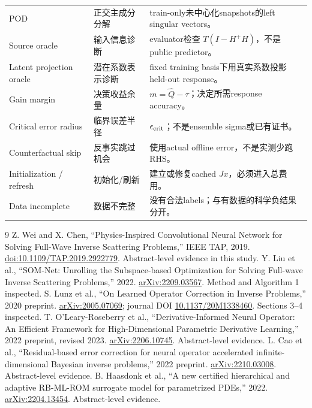 \documentclass[UTF8,11pt,a4paper,fontset=fandol]{ctexart}
\begin{document}
\begin{longtable}{p{.26\linewidth}p{.24\linewidth}p{.42\linewidth}}
POD & 正交主成分分解 & train-only未中心化snapshots的left singular vectors。\\
Source oracle & 输入信息诊断 & evaluator检查 $T(I-H^+H)$，不是public predictor。\\
Latent projection oracle & 潜在系数表示诊断 & fixed training basis下用真实系数投影held-out response。\\
Gain margin & 决策收益余量 & $m=\hat Q-\tau$；决定所需response accuracy。\\
Critical error radius & 临界误差半径 & $\epsilon_{\rm crit}$；不是ensemble sigma或已有证书。\\
Counterfactual skip & 反事实跳过机会 & 使用actual offline error，不是实测少跑RHS。\\
Initialization / refresh & 初始化/刷新 & 建立或修复cached $Jx$，必须进入总费用。\\
Data incomplete & 数据不完整 & 没有合法labels；与有数据的科学负结果分开。\\
\bottomrule\end{longtable}\normalsize

\begin{thebibliography}{9}
 Z. Wei and X. Chen, ``Physics-Inspired Convolutional Neural Network for Solving Full-Wave Inverse Scattering Problems,'' IEEE TAP, 2019. \href{https://doi.org/10.1109/TAP.2019.2922779}{doi:10.1109/TAP.2019.2922779}. Abstract-level evidence in this study.
 Y. Liu et al., ``SOM-Net: Unrolling the Subspace-based Optimization for Solving Full-wave Inverse Scattering Problems,'' 2022. \href{https://arxiv.org/abs/2209.03567}{arXiv:2209.03567}. Method and Algorithm 1 inspected.
 S. Lunz et al., ``On Learned Operator Correction in Inverse Problems,'' 2020 preprint. \href{https://arxiv.org/abs/2005.07069}{arXiv:2005.07069}; journal DOI \href{https://doi.org/10.1137/20M1338460}{10.1137/20M1338460}. Sections 3--4 inspected.
 T. O'Leary-Roseberry et al., ``Derivative-Informed Neural Operator: An Efficient Framework for High-Dimensional Parametric Derivative Learning,'' 2022 preprint, revised 2023. \href{https://arxiv.org/abs/2206.10745}{arXiv:2206.10745}. Abstract-level evidence.
 L. Cao et al., ``Residual-based error correction for neural operator accelerated infinite-dimensional Bayesian inverse problems,'' 2022 preprint. \href{https://arxiv.org/abs/2210.03008}{arXiv:2210.03008}. Abstract-level evidence.
 B. Haasdonk et al., ``A new certified hierarchical and adaptive RB-ML-ROM surrogate model for parametrized PDEs,'' 2022. \href{https://arxiv.org/abs/2204.13454}{arXiv:2204.13454}. Abstract-level evidence.
\end{thebibliography}
\end{document}
